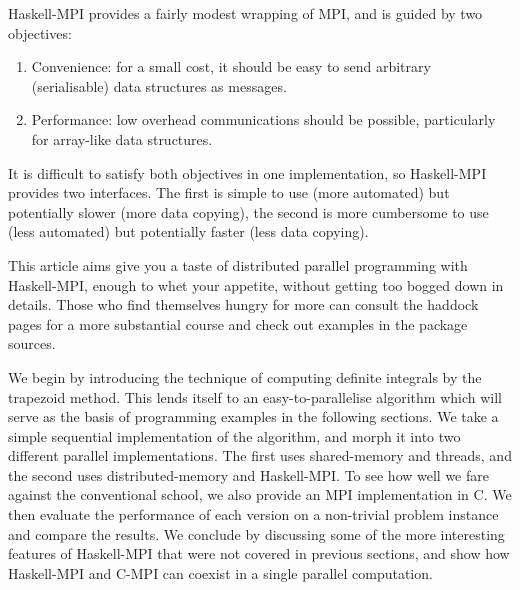 \documentclass{tmr}
\begin{document}
Haskell-MPI provides a fairly modest wrapping of MPI, and is guided by two objectives:
\begin{enumerate}
 \item Convenience: for a small cost, it should be easy to send arbitrary (serialisable)
data structures as messages.
 \item Performance: low overhead communications should be possible,
particularly for array-like data structures.
\end{enumerate}
It is difficult to satisfy both objectives in one implementation, so Haskell-MPI provides two interfaces.
The first is simple to use (more automated) but potentially slower (more data copying), the second
is more cumbersome to use (less automated) but potentially faster (less data copying).

This article aims give you a taste of distributed parallel programming with Haskell-MPI, enough to
whet your appetite, without getting too bogged down in details. Those who find themselves hungry for
more can consult the haddock pages for a more substantial course and check out examples in the package sources.

We begin by introducing the technique of computing definite integrals by the trapezoid method.
This lends itself to an easy-to-parallelise algorithm which will serve as the
basis of programming examples in the following sections. We take a simple sequential implementation
of the algorithm, and morph it into two different parallel implementations.
The first uses shared-memory and threads, and the second uses distributed-memory and Haskell-MPI.
To see how well we fare against the conventional school, we also provide an MPI implementation in C.
We then evaluate the performance of each version on a non-trivial problem instance and compare the results.
We conclude by discussing some of the more interesting features of Haskell-MPI that were not covered in
previous sections, and show how Haskell-MPI and C-MPI can coexist in a single parallel computation.

\end{document}
